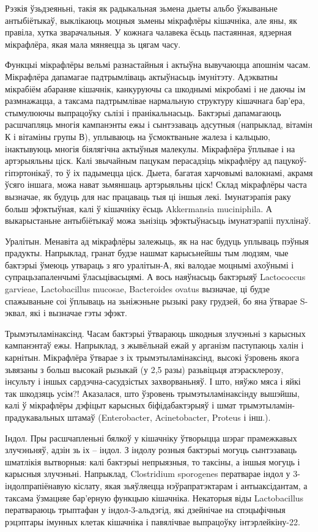 Рэзкія ўзьдзеяньні, такія як радыкальная зьмена дыеты альбо ўжываньне антыбіётыкаў, выклікаюць моцныя зьмены мікрафлёры кішачніка, але яны, як правіла, хутка зварачальныя. У кожнага чалавека ёсьць пастаянная, ядзерная мікрафлёра, якая мала мяняецца зь цягам часу.

Функцыі мікрафлёры вельмі разнастайныя і актыўна вывучаюцца апошнім часам. Мікрафлёра дапамагае падтрымліваць актыўнасьць імунітэту. Адэкватны мікрабіём абараняе кішачнік, канкуруючы са шкоднымі мікробамі і не даючы ім размнажацца, а таксама падтрымлівае нармальную структуру кішачнага бар'ера, стымулюючы выпрацоўку сьлізі і пранікальнасьць. Бактэрыі дапамагаюць расшчапляць многія кампанэнты ежы і сынтэзаваць адсутныя (напрыклад, вітамін К і вітаміны групы В), уплываюць на ўсмоктваньне жалеза і кальцыю, інактывуюць многія біялягічна актыўныя малекулы. Мікрафлёра ўплывае і на артэрыяльны ціск. Калі звычайным пацукам перасадзіць мікрафлёру ад пацукоў-гіпэртонікаў, то ў іх падымецца ціск. Дыета, багатая харчовымі валокнамі, акрамя ўсяго іншага, можа нават зьмяншаць артэрыяльны ціск! Склад мікрафлёры часта вызначае, як будуць для нас працаваць тыя ці іншыя лекі. Імунатэрапія раку больш эфэктыўная, калі ў кішачніку ёсьць Akkermansia muciniphila. А выкарыстаньне антыбіётыкаў можа зьнізіць эфэктыўнасьць імунатэрапіі пухлінаў.

Уралітын. Менавіта ад мікрафлёры залежыць, як на нас будуць уплываць пэўныя прадукты. Напрыклад, гранат будзе нашмат карысьнейшы тым людзям, чые бактэрыі ўмеюць утвараць з яго уралітын-А, які валодае моцнымі ахоўнымі і супрацьзапаленчымі ўласьцівасьцямі. А вось наяўнасьць бактэрыяў Lactococcus garvieae, Lactobacillus mucosae, Bacteroides ovatus вызначае, ці будзе спажываньне соі ўплываць на зьніжэньне рызыкі раку грудзей, бо яна ўтварае S-эквал, які і вызначае гэты эфэкт.

Трымэтыламінаксінд. Часам бактэрыі ўтвараюць шкодныя злучэньні з карысных кампанэнтаў ежы. Напрыклад, з жывёльнай ежай у арганізм паступаюць халін і карнітын. Мікрафлёра ўтварае з іх трымэтыламінаксінд, высокі ўзровень якога зьвязаны з больш высокай рызыкай (у 2,5 разы) разьвіцьця атэрасклерозу, інсульту і іншых сардэчна-сасудзістых захворваньняў. І што, няўжо мяса і яйкі так шкодзяць усім?! Аказалася, што ўзровень трымэтыламінаксінду вышэйшы, калі ў мікрафлёры дэфіцыт карысных біфідабактэрыяў і шмат трымэтыламін-прадукавальных штамаў (Enterobacter, Acinetobacter, Proteus і інш.).

Індол. Пры расшчапленьні бялкоў у кішачніку ўтворыцца шэраг прамежкавых злучэньняў, адзін зь іх – індол. З індолу розныя бактэрыі могуць сынтэзаваць шматлікія вытворныя: калі бактэрыі непрыязныя, то таксіны, а іншыя могуць і карысныя злучэньні. Напрыклад, Clostridium sporogenes ператварае індол у 3-індолпрапіёнавую кіслату, якая зьяўляецца нэўрапратэктарам і антыаксідантам, а таксама ўзмацняе бар'ерную функцыю кішачніка. Некаторыя віды Lactobacillus ператвараюць трыптафан у індол-3-альдэгід, які дзейнічае на спэцыфічныя рэцэптары імунных клетак кішачніка і павялічвае выпрацоўку інтэрлейкіну-22.

